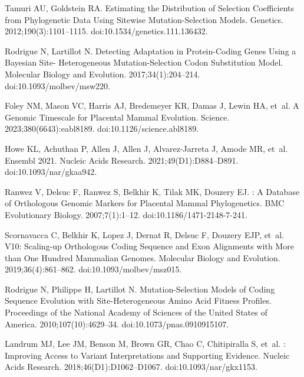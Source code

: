 \documentclass[10pt,letterpaper]{article}
\begin{document}
\begin{thebibliography}{10}
Tamuri AU, Goldstein RA.
\newblock Estimating the Distribution of Selection Coefficients from
Phylogenetic Data Using Sitewise Mutation-Selection Models.
\newblock Genetics. 2012;190(3):1101--1115.
\newblock doi:{10.1534/genetics.111.136432}.

Rodrigue N, Lartillot N.
\newblock Detecting Adaptation in Protein-Coding Genes Using a {{Bayesian}}
Site- Heterogeneous Mutation-Selection Codon Substitution Model.
\newblock Molecular Biology and Evolution. 2017;34(1):204--214.
\newblock doi:{10.1093/molbev/msw220}.

Foley NM, Mason VC, Harris AJ, Bredemeyer KR, Damas J, Lewin HA, et~al.
\newblock A Genomic Timescale for Placental Mammal Evolution.
\newblock Science. 2023;380(6643):eabl8189.
\newblock doi:{10.1126/science.abl8189}.

Howe KL, Achuthan P, Allen J, Allen J, {Alvarez-Jarreta} J, Amode MR, et~al.
\newblock Ensembl 2021.
\newblock Nucleic Acids Research. 2021;49(D1):D884--D891.
\newblock doi:{10.1093/nar/gkaa942}.

Ranwez V, Delsuc F, Ranwez S, Belkhir K, Tilak MK, Douzery EJ.
: {{A}} Database of Orthologous Genomic Markers for
Placental Mammal Phylogenetics.
\newblock BMC Evolutionary Biology. 2007;7(1):1--12.
\newblock doi:{10.1186/1471-2148-7-241}.

Scornavacca C, Belkhir K, Lopez J, Dernat R, Delsuc F, Douzery EJP, et~al.
 V10: {{Scaling-up}} Orthologous Coding Sequence and Exon
Alignments with More than One Hundred Mammalian Genomes.
\newblock Molecular Biology and Evolution. 2019;36(4):861--862.
\newblock doi:{10.1093/molbev/msz015}.

Rodrigue N, Philippe H, Lartillot N.
\newblock Mutation-Selection Models of Coding Sequence Evolution with
Site-Heterogeneous Amino Acid Fitness Profiles.
\newblock Proceedings of the National Academy of Sciences of the United States
of America. 2010;107(10):4629--34.
\newblock doi:{10.1073/pnas.0910915107}.

Landrum MJ, Lee JM, Benson M, Brown GR, Chao C, Chitipiralla S, et~al.
: Improving Access to Variant Interpretations and
Supporting Evidence.
\newblock Nucleic Acids Research. 2018;46(D1):D1062--D1067.
\newblock doi:{10.1093/nar/gkx1153}.


\end{thebibliography}
\end{document}
